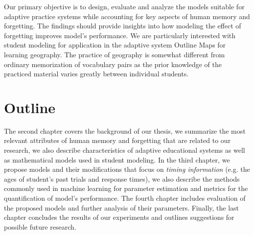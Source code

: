 Our primary objective is to design, evaluate and analyze the models suitable for adaptive practice systems while accounting for key aspects of human memory and forgetting. The findings should provide insights into how modeling the effect of forgetting improves model's performance. We are particularly interested with student modeling for application in the adaptive system Outline Maps for learning geography. The practice of geography is somewhat different from ordinary memorization of vocabulary pairs as the prior knowledge of the practiced material varies greatly between individual students.

\section{Outline}

The second chapter covers the background of our thesis, we summarize the most relevant attributes of human memory and forgetting that are related to our research, we also describe characteristics of adaptive educational systems as well as mathematical models used in student modeling. In the third chapter, we propose models and their modifications that focus on \textit{timing information} (e.g. the ages of student's past trials and response times), we also describe the methods commonly used in machine learning for parameter estimation and metrics for the quantification of model's performance. The fourth chapter includes evaluation of the proposed models and further analysis of their parameters. Finally, the last chapter concludes the results of our experiments and outlines suggestions for possible future research.
